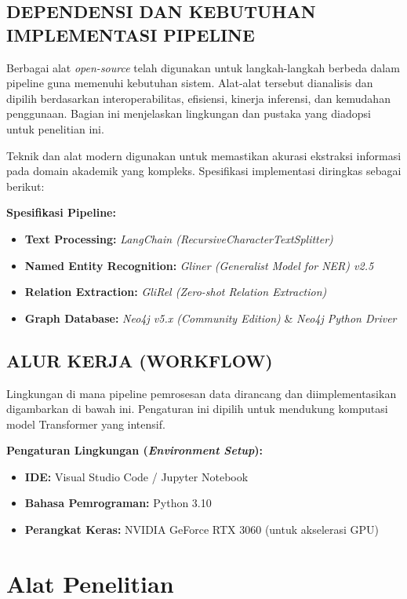 \subsection{DEPENDENSI DAN KEBUTUHAN IMPLEMENTASI PIPELINE}

Berbagai alat \textit{open-source} telah digunakan untuk langkah-langkah berbeda dalam pipeline guna memenuhi kebutuhan sistem. Alat-alat tersebut dianalisis dan dipilih berdasarkan interoperabilitas, efisiensi, kinerja inferensi, dan kemudahan penggunaan. Bagian ini menjelaskan lingkungan dan pustaka yang diadopsi untuk penelitian ini.

Teknik dan alat modern digunakan untuk memastikan akurasi ekstraksi informasi pada domain akademik yang kompleks. Spesifikasi implementasi diringkas sebagai berikut:

\textbf{Spesifikasi Pipeline:}
\begin{itemize}
    \item \textbf{Text Processing:} \textit{LangChain (RecursiveCharacterTextSplitter)}
    \item \textbf{Named Entity Recognition:} \textit{Gliner (Generalist Model for NER) v2.5}
    \item \textbf{Relation Extraction:} \textit{GliRel (Zero-shot Relation Extraction)}
    \item \textbf{Graph Database:} \textit{Neo4j v5.x (Community Edition)} & \textit{Neo4j Python Driver}
\end{itemize}

\subsection{ALUR KERJA (WORKFLOW)}

Lingkungan di mana pipeline pemrosesan data dirancang dan diimplementasikan digambarkan di bawah ini. Pengaturan ini dipilih untuk mendukung komputasi model Transformer yang intensif.

\textbf{Pengaturan Lingkungan (\textit{Environment Setup}):}
\begin{itemize}
    \item \textbf{IDE:} Visual Studio Code / Jupyter Notebook
    \item \textbf{Bahasa Pemrograman:} Python 3.10
    \item \textbf{Perangkat Keras:} NVIDIA GeForce RTX 3060 (untuk akselerasi GPU)
\end{itemize}

\section{Alat Penelitian}
\label{sec:alat-penelitian}

